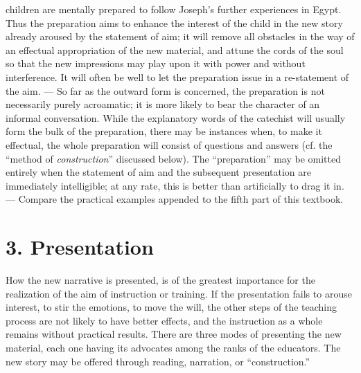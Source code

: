 children are mentally prepared to follow Joseph’s further experiences in Egypt. Thus the preparation aims to enhance the interest of the child in the new story already aroused by the statement of aim; it will remove all obstacles in the way of an effectual appropriation of the new material, and attune the cords of the soul so that the new impressions may play upon it with power and without interference. It will often be well to let the preparation issue in a re-statement of the aim. — So far as the outward form is concerned, the preparation is not necessarily purely acroamatic; it is more likely to bear the character of an informal conversation. While the explanatory words of the catechist will usually form the bulk of the preparation, there may be instances when, to make it effectual, the whole preparation will consist of questions and answers (cf. the “method of \emph{construction}” discussed below). The “preparation” may be omitted entirely when the statement of aim and the subsequent presentation are immediately intelligible; at any rate, this is better than artificially to drag it in. — Compare the practical examples appended to the fifth part of this textbook.

\section{3. Presentation}

How the new narrative is presented, is of the greatest importance for the realization of the aim of instruction or training. If the presentation fails to arouse interest, to stir the emotions, to move the will, the other steps of the teaching process are not likely to have better effects, and the instruction as a whole remains without practical results. There are three modes of presenting the new material, each one having its advocates among the ranks of the educators. The new story may be offered through reading, narration, or “construction.”

